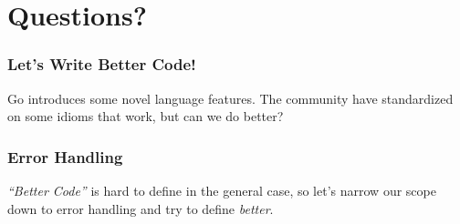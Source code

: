 \documentclass{beamer}
\begin{document}
\section{Questions?}

\begin{frame}
  \frametitle{Let's Write Better Code!}
  Go introduces some novel language features.  The community have
  standardized on some idioms that work, but can we do better?
\end{frame}

\begin{frame}
  \frametitle{Error Handling}
  {\it ``Better Code''} is hard to define in the general case, so let's
  narrow our scope down to error handling and try to define
  {\it better}.
\end{frame}
\end{document}
